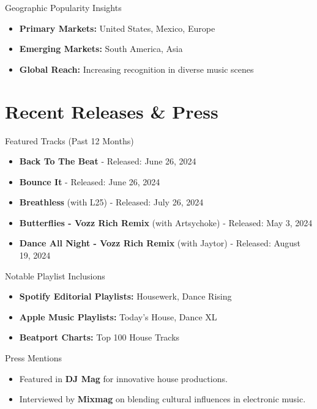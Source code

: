 \documentclass{article}
\begin{document}
\noindent
{\Large Geographic Popularity Insights}
\begin{itemize}[leftmargin=*]
    \item \textbf{Primary Markets:} United States, Mexico, Europe
    \item \textbf{Emerging Markets:} South America, Asia
    \item \textbf{Global Reach:} Increasing recognition in diverse music scenes
\end{itemize}

\section*{\textcolor{maincolor}{Recent Releases \& Press}}
    \noindent
    {\Large Featured Tracks (Past 12 Months)}
    \begin{itemize}[leftmargin=*]
        \item \textbf{Back To The Beat} - Released: June 26, 2024
        \item \textbf{Bounce It} - Released: June 26, 2024
        \item \textbf{Breathless} (with L25) - Released: July 26, 2024
        \item \textbf{Butterflies - Vozz Rich Remix} (with Artsychoke) - Released: May 3, 2024
        \item \textbf{Dance All Night - Vozz Rich Remix} (with Jaytor) - Released: August 19, 2024
    \end{itemize}

    \noindent
    {\Large Notable Playlist Inclusions}
    \begin{itemize}[leftmargin=*]
        \item \textbf{Spotify Editorial Playlists:} Housewerk, Dance Rising
        \item \textbf{Apple Music Playlists:} Today's House, Dance XL
        \item \textbf{Beatport Charts:} Top 100 House Tracks
    \end{itemize}

    \noindent
    {\Large Press Mentions}
    \begin{itemize}[leftmargin=*]
        \item Featured in \textbf{DJ Mag} for innovative house productions.
        \item Interviewed by \textbf{Mixmag} on blending cultural influences in electronic music.
    \end{itemize}
\end{document}
